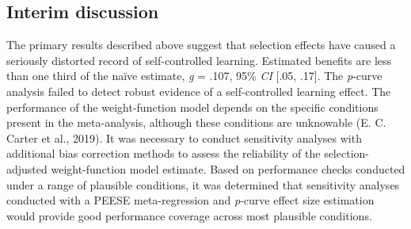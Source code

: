 \documentclass[
  english,
  man, donotrepeattitle,floatsintext]{apa7}
\begin{document}
\hypertarget{interim-discussion}{%
\subsection{Interim discussion}\label{interim-discussion}}

The primary results described above suggest that selection effects have caused a seriously distorted record of self-controlled learning. Estimated benefits are less than one third of the naïve estimate, \emph{g} = .107, 95\% \emph{CI} {[}.05, .17{]}. The \emph{p}-curve analysis failed to detect robust evidence of a self-controlled learning effect. The performance of the weight-function model depends on the specific conditions present in the meta-analysis, although these conditions are unknowable (E. C. Carter et al., 2019). It was necessary to conduct sensitivity analyses with additional bias correction methods to assess the reliability of the selection-adjusted weight-function model estimate. Based on performance checks conducted under a range of plausible conditions, it was determined that sensitivity analyses conducted with a PEESE meta-regression and \emph{p}-curve effect size estimation would provide good performance coverage across most plausible conditions.
\end{document}
